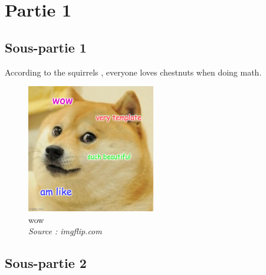 \section{Partie 1}

\subsection{Sous-partie 1}

According to the squirrels \cite{einstein}, everyone loves chestnuts when doing \gls{math}.

\lipsum

\begin{figure}[h]
	\centering
    \includegraphics[width=0.5\textwidth]{images/example.jpg}
	\caption{wow\\\emph{Source : imgflip.com}}
	\label{fig:wow}
\end{figure}

\lipsum

\subsection{Sous-partie 2}

\lipsum